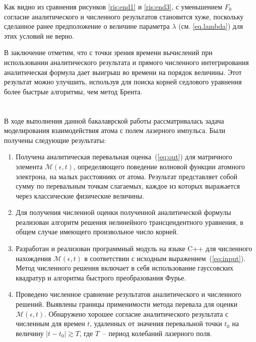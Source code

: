 \documentclass[14pt, a4paper]{article}
\numberwithin{figure}{section}
\numberwithin{equation}{section}
\newcommand{\sectionbreak}{\clearpage}
\newcommand{\cM}{\mathcal{M}}
\begin{document}
Как видно из сравнения рисунков \ref{ris:end1} и \ref{ris:end3}, с уменьшением $F_0$ согласие аналитического и численного результатов становится хуже, поскольку сделанное ранее предположение о величине параметра $\lambda$ (см. \ref{eq.lambda}) для этих условий не верно.

В заключение отметим, что с точки зрения времени вычислений при использовании аналитического результата и прямого численного интегрирования аналитическая формула дает выигрыш во времени на порядок величины. Этот результат можно улучшить, используя для поиска корней седлового уравнения более быстрые алгоритмы, чем метод Брента.

\sectionbreak
\section*{}

В ходе выполнения данной бакалаврской работы рассматривалась задача моделирования взаимодействия атома с полем лазерного импульса. Были получены следующие результаты:
\begin{enumerate}
\item
Получена аналитическая перевальная оценка~(\ref{eq:out}) для матричного элемента $\cM(\epsilon,t)$, определяющего поведение волновой функции атомного электрона,  на малых расстояниях от атома. Результат представляет собой сумму по перевальным точкам слагаемых, каждое из которых выражается через классические физические величины.
\item 
Для получения численной оценки полученной аналитической формулы реализован алгоритм решения нелинейного трансцендентного уравнения, в общем случае имеющего произвольное число корней.
\item 
Разработан и реализован программный модуль на языке C++ для численного нахождения $\cM(\epsilon,t)$ в соответствии с исходным выражением~(\ref{eq:input}). Метод численного решения включает в себя использование гауссовских квадратур и алгоритма быстрого преобразования Фурье.
\item
Проведено численное сравнение результатов аналитического и численного решений. Выявлены границы применимости метода перевала для оценки $\cM(\epsilon,t)$. Обнаружено хорошее согласие аналитического результата с численным для времен $t$, удаленных от значения перевальной точки $t_0$ на величину $|t-t_0|\gtrsim T$, где $T$~-- период колебаний лазерного поля.
\end{enumerate}
\end{document}
